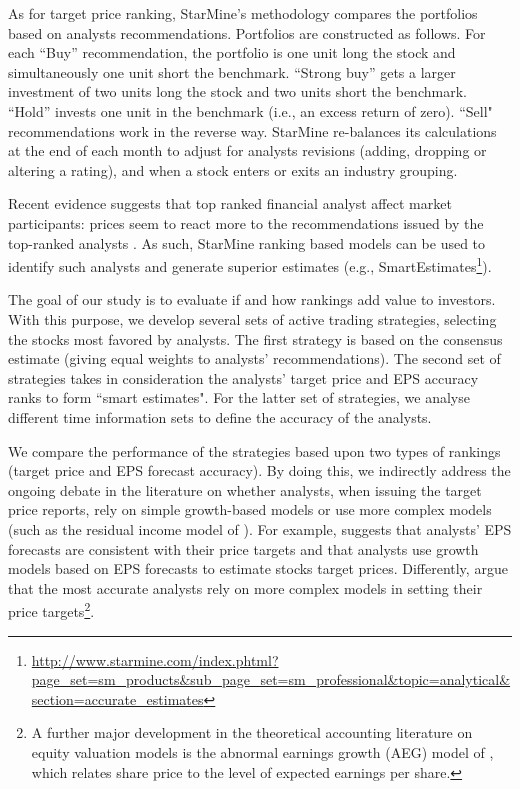 \documentclass{article}\usepackage[]{graphicx}\usepackage[]{color}
\begin{document}
As for target price ranking, StarMine's methodology compares the portfolios based on analysts recommendations. Portfolios are constructed as follows. For each ``Buy'' recommendation, the portfolio is one unit long the stock and simultaneously one unit short the benchmark. ``Strong buy'' gets a larger investment of two units long the stock and two units short the benchmark. ``Hold'' invests one unit in the benchmark (i.e., an excess return of zero). ``Sell" recommendations work in the reverse way. StarMine re-balances its calculations at the end of each month to adjust for analysts revisions (adding, dropping or altering a rating), and when a stock enters or exits an industry grouping.


Recent evidence suggests that top ranked financial analyst affect market participants: prices seem to react more to the recommendations issued by the top-ranked analysts \citep{emery2009}. As such, StarMine ranking based models can be used to identify such analysts and generate superior estimates (e.g., SmartEstimates\footnote{\url{http://www.starmine.com/index.phtml?page_set=sm_products&sub_page_set=sm_professional&topic=analytical&section=accurate_estimates}}).



The goal of our study is to evaluate if and how rankings  add value to investors.  With this purpose, we develop several sets of active trading strategies, selecting the stocks most favored by analysts. The first strategy is based on the consensus estimate (giving equal weights to analysts' recommendations). The second set of strategies takes in consideration the analysts' target price and EPS accuracy ranks to form ``smart estimates". For the latter set of strategies, we analyse different time information sets to define the accuracy of the analysts.


We compare the performance of the strategies based upon two types of rankings (target price and EPS forecast accuracy). By doing this, we indirectly address the ongoing debate in the literature on whether analysts, when issuing the target price reports, rely on simple growth-based models or use more complex models (such as the residual income model of \cite{ohlson1995}). For example, \cite{bradshaw2004} suggests that analysts' EPS forecasts are consistent with their price targets and that analysts use growth models based on EPS forecasts to estimate stocks target prices. Differently, \cite{simon2011} argue that the most accurate analysts rely on more complex models in setting their price targets\footnote{A further major development in the theoretical accounting literature on equity valuation models is the abnormal earnings growth (AEG) model of \cite{ohlson2005}, which relates share price to the level of expected earnings per share.}.
\end{document}
